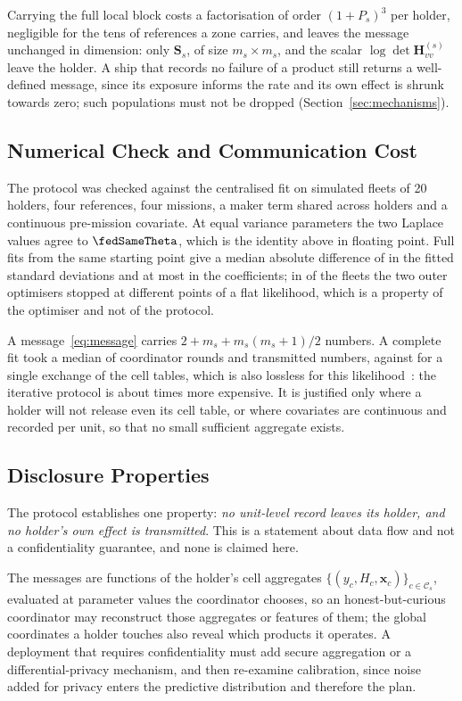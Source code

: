 Carrying the full local block costs a factorisation of order $(1+P_s)^3$ per
holder, negligible for the tens of references a zone carries, and leaves the
message unchanged in dimension: only $\mathbf S_s$, of size $m_s\times m_s$, and
the scalar $\log\det\mathbf H_{vv}^{(s)}$ leave the holder. A ship that records
no failure of a product still returns a well-defined message, since its exposure
informs the rate and its own effect is shrunk towards zero; such populations
must not be dropped (Section~\ref{sec:mechanisms}).

\subsection{Numerical Check and Communication Cost}
The protocol was checked against the centralised fit on \fedN{} simulated
fleets of 20 holders, four references, four missions, a maker term shared
across holders and a continuous pre-mission covariate. At equal variance
parameters the two Laplace values agree to $\fedSameTheta$, which is the
identity above in floating point. Full fits from the same starting point give
a median absolute difference of \fedSigMed{} in the fitted standard deviations
and at most \fedBetaMax{} in the coefficients; in \fedDiverge{} of the
\fedN{} fleets the two outer optimisers stopped at different points of a flat
likelihood, which is a property of the optimiser and not of the protocol.

A message~\eqref{eq:message} carries $2+m_s+m_s(m_s+1)/2$ numbers. A complete
fit took a median of \fedRounds{} coordinator rounds and \fedFloats{}
transmitted numbers, against \fedOneShot{} for a single exchange of the cell
tables, which is also lossless for this
likelihood~\cite{luo2022dlmm,tong2025cola}: the iterative protocol is about
\fedRatio{} times more expensive. It is justified only where a holder will not
release even its cell table, or where covariates are continuous and recorded
per unit, so that no small sufficient aggregate exists.

\subsection{Disclosure Properties}
The protocol establishes one property: \emph{no unit-level record leaves its
holder, and no holder's own effect is transmitted}. This is a statement about
data flow and not a confidentiality guarantee, and none is claimed here.

The messages are functions of the holder's cell aggregates
$\{(y_c,H_c,\mathbf x_c)\}_{c\in\mathcal C_s}$, evaluated at parameter values the
coordinator chooses, so an honest-but-curious coordinator may reconstruct those
aggregates or features of them; the global coordinates a holder touches also
reveal which products it operates. A deployment that requires confidentiality
must add secure aggregation or a differential-privacy mechanism, and then
re-examine calibration, since noise added for privacy enters the predictive
distribution and therefore the plan.
